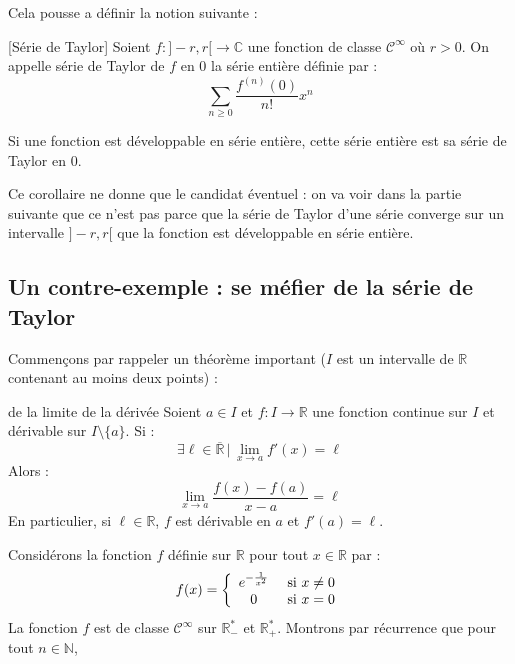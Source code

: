 \documentclass[french,11pt,twoside]{VcCours}
\begin{document}
Cela pousse a définir la notion suivante :

\begin{Definition}{}[Série de Taylor]
Soient $f : ]-r,r[ \rightarrow \mathbb{C}$ une fonction de classe $\mathcal{C}^{\infty}$ où $r>0$. On appelle série de Taylor de $f$ en $0$ la série entière définie par :
$$ \sum_{n \geq 0} \frac{f^{(n)}(0)}{n!} x^n$$
\end{Definition}

\begin{Corollaire}{} Si une fonction est développable en série entière, cette série entière est sa série de Taylor en $0$.
\end{Corollaire}

\begin{Remarque}[\alerte]{} Ce corollaire ne donne que le candidat éventuel : on va voir dans la partie suivante que ce n'est pas parce que la série de Taylor d'une série converge sur un intervalle $]-r,r[$ que la fonction est développable en série entière.
\end{Remarque}

\subsection{Un contre-exemple : se méfier de la série de Taylor}

Commençons par rappeler un théorème important ($I$ est un intervalle de $\mathbb{R}$ contenant au moins deux points) :

\begin{Theoreme}{de la limite de la dérivée} Soient $a \in I$ et $f : I \rightarrow \mathbb{R}$ une fonction continue sur $I$ et dérivable sur $I \setminus \lbrace a \rbrace$. Si :
$$ \exists \ell \in \overline{\mathbb{R}} \, \vert \, \lim_{x \rightarrow a} f'(x) = \ell$$
Alors :
$$ \lim_{x \rightarrow a } \dfrac{f(x)-f(a)}{x-a} = \ell$$
En particulier, si $\ell \in \mathbb{R}$, $f$ est dérivable en $a$ et $f'(a)= \ell$.
\end{Theoreme}

Considérons la fonction $f$ définie sur $\mathbb{R}$ pour tout $x \in \mathbb{R}$ par :
$$ f(x) = \left\lbrace \begin{array}{cl}
e^{- \frac{1}{x^2} } & \hbox{ si } x \neq 0 \\
0 & \hbox{ si } x=0\\
\end{array}\right.$$
La fonction $f$ est de classe $\mathcal{C}^{\infty}$ sur $\mathbb{R}_{-}^{*}$ et $\mathbb{R}_{+}^{*}$. Montrons par récurrence que pour tout $n \in \mathbb{N}$,
\end{document}
